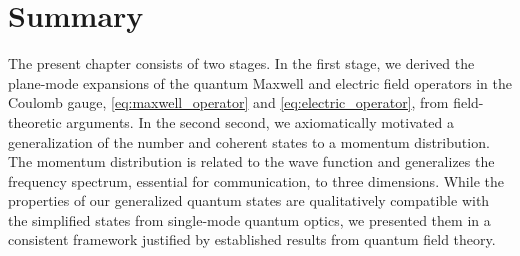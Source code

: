 \section*{Summary}

The present chapter consists of two stages.
In the first stage, we derived the plane-mode expansions of the quantum Maxwell and electric field operators in the Coulomb gauge, \cref{eq:maxwell_operator} and \cref{eq:electric_operator}, from field-theoretic arguments.
In the second second, we axiomatically motivated a generalization of the number and coherent states to a momentum distribution.
The momentum distribution is related to the wave function and generalizes the frequency spectrum, essential for communication, to three dimensions.
While the properties of our generalized quantum states are qualitatively compatible with the simplified states from single-mode quantum optics, we presented them in a consistent framework justified by established results from quantum field theory.

